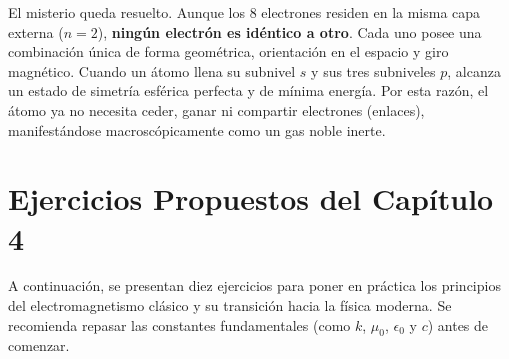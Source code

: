 \documentclass[11pt,a4paper]{book}
\begin{document}
El misterio queda resuelto. Aunque los $8$ electrones residen en la misma capa externa ($n=2$), \textbf{ningún electrón es idéntico a otro}. Cada uno posee una combinación única de forma geométrica, orientación en el espacio y giro magnético. Cuando un átomo llena su subnivel $s$ y sus tres subniveles $p$, alcanza un estado de simetría esférica perfecta y de mínima energía. Por esta razón, el átomo ya no necesita ceder, ganar ni compartir electrones (enlaces), manifestándose macroscópicamente como un gas noble inerte.

\section{Ejercicios Propuestos del Capítulo 4}

A continuación, se presentan diez ejercicios para poner en práctica los principios del electromagnetismo clásico y su transición hacia la física moderna. Se recomienda repasar las constantes fundamentales (como $k$, $\mu_0$, $\epsilon_0$ y $c$) antes de comenzar.
\end{document}
